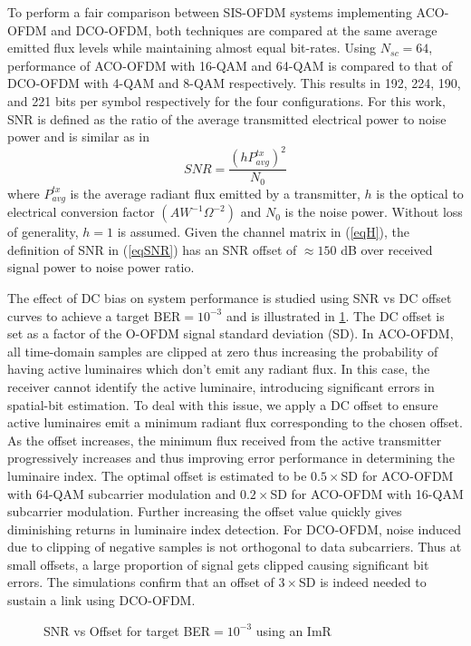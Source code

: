 \documentclass[12pt,letterpaper,onecolumn]{article} %
\begin{document}
To perform a fair comparison between SIS-OFDM systems implementing ACO-OFDM and DCO-OFDM, both techniques are compared at the same average emitted flux levels while maintaining almost equal bit-rates. Using $N_{sc}=64$, performance of ACO-OFDM with 16-QAM and 64-QAM is compared to that of DCO-OFDM with 4-QAM and 8-QAM respectively. This results in 192, 224, 190, and 221 bits per symbol respectively for the four configurations. For this work, SNR is defined as the ratio of the average transmitted electrical power to noise power and is similar as in \cite{fat13a}
\begin{equation}
	\label{eqSNR}
	SNR = \frac{(hP_{avg}^{tx})^2}{N_{0}}
\end{equation}
where $P_{avg}^{tx}$ is the average radiant flux emitted by a transmitter, $h$ is the optical to electrical conversion factor $(AW^{-1}\Omega^{-2})$ and $N_0$ is the noise power. Without loss of generality, $h=1$ is assumed. Given the channel matrix in (\ref{eqH}), the definition of SNR in (\ref{eqSNR}) has an SNR offset of $\approx 150$ dB over received signal power to noise power ratio.

The effect of DC bias on system performance is studied using SNR vs DC offset curves to achieve a target BER$=10^{-3}$ and is illustrated in \figurename{\ref{fig:SNRvsOfst}}. The DC offset is set as a factor of the O-OFDM signal standard deviation (SD). In ACO-OFDM, all time-domain samples are clipped at zero thus increasing the probability of having active luminaires which don't emit any radiant flux. In this case, the receiver cannot identify the active luminaire, introducing significant errors in spatial-bit estimation. To deal with this issue, we apply a DC offset to ensure active luminaires emit a minimum radiant flux corresponding to the chosen offset. As the offset increases, the minimum flux received from the active transmitter progressively increases and thus improving error performance in determining the luminaire index. The optimal offset is estimated to be $0.5\times$SD for ACO-OFDM with 64-QAM subcarrier modulation and $0.2\times$SD for ACO-OFDM with 16-QAM subcarrier modulation. Further increasing the offset value quickly gives diminishing returns in luminaire index detection. For DCO-OFDM, noise induced due to clipping of negative samples is not orthogonal to data subcarriers. Thus at small offsets, a large proportion of signal gets clipped causing significant bit errors. The simulations confirm that an offset of $3\times$SD is indeed needed to sustain a link using DCO-OFDM.
\begin{figure}[!t]
\makebox[\textwidth]{\framebox[3.3in]{\rule{0pt}{2.48in}}}
\caption{SNR vs Offset for target BER$= 10^{-3}$ using an ImR}
	\label{fig:SNRvsOfst}
\end{figure}
\end{document}
